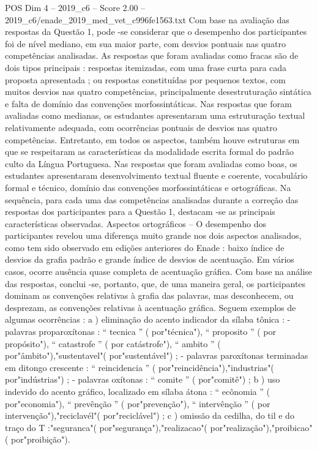 \begin{textsample}{POS Dim 4 – 2019\_c6 – Score 2.00 – 2019\_c6/enade\_2019\_med\_vet\_c996fe1563.txt}
Com base na avaliação das respostas da Questão 1, pode -se considerar que o desempenho dos participantes foi de nível mediano, em sua maior parte, com desvios pontuais nas quatro competências analisadas.
As respostas que foram avaliadas como fracas são de dois tipos principais : respostas itemizadas, com uma frase curta para cada proposta apresentada ; ou respostas constituídas por pequenos textos, com muitos desvios nas quatro competências, principalmente desestruturação sintática e falta de domínio das convenções morfossintáticas.
Nas respostas que foram avaliadas como medianas, os estudantes apresentaram uma estruturação textual relativamente adequada, com ocorrências pontuais de desvios nas quatro competências.
Entretanto, em todos os aspectos, também houve estruturas em que se respeitaram as características da modalidade escrita formal do padrão culto da Língua Portuguesa.
Nas respostas que foram avaliadas como boas, os estudantes apresentaram desenvolvimento textual fluente e coerente, vocabulário formal e técnico, domínio das convenções morfossintáticas e ortográficas.
Na sequência, para cada uma das competências analisadas durante a correção das respostas dos participantes para a Questão 1, destacam -se as principais características observadas.
Aspectos ortográficos – O desempenho dos participantes revelou uma diferença muito grande nos dois aspectos analisados, como tem sido observado em edições anteriores do Enade : baixo índice de desvios da grafia padrão e grande índice de desvios de acentuação.
Em vários casos, ocorre ausência quase completa de acentuação gráfica.
Com base na análise das respostas, conclui -se, portanto, que, de uma maneira geral, os participantes dominam as convenções relativas à grafia das palavras, mas desconhecem, ou desprezam, as convenções relativas à acentuação gráfica.
Seguem exemplos de algumas ocorrências : a ) eliminação do acento indicador da sílaba tônica : - palavras proparoxítonas : “ tecnica ” ( por"técnica"), “ proposito ” ( por propósito"), “ catastrofe ” ( por catástrofe"), “ ambito ” ( por"âmbito"),"sustentavel"( por"sustentável") ; - palavras paroxítonas terminadas em ditongo crescente : “ reincidencia ” ( por"reincidência"),"industrias"( por"indústrias") ; - palavras oxítonas : “ comite ” ( por"comitê") ; b ) uso indevido do acento gráfico, localizado em sílaba átona : “ ecônomia ” ( por"economia"), “ prevênção ” ( por"prevenção"), “ intervênção ” ( por intervenção"),"reciclavél"( por"reciclável") ; c ) omissão da cedilha, do til e do traço do T :"seguranca"( por"segurança"),"realizacao"( por"realização"),"proibicao"( por"proibição").

\end{textsample}
